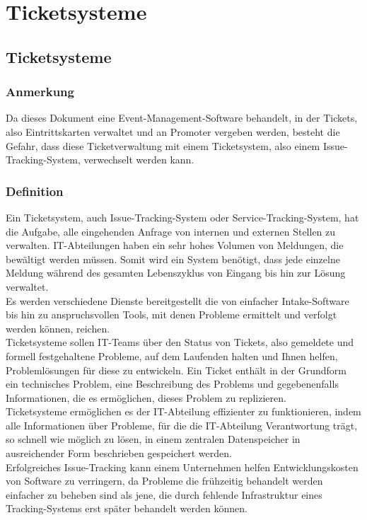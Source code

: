 \chapter{Ticketsysteme}
\reiter

  \section{Ticketsysteme}
  
  \subsection{Anmerkung}
  Da dieses Dokument eine Event-Management-Software behandelt, in der Tickets, also Eintrittskarten verwaltet und an Promoter vergeben werden, besteht die Gefahr, dass diese Ticketverwaltung mit einem Ticketsystem, also einem Issue-Tracking-System, verwechselt werden kann.  
  
  \subsection{Definition}
    Ein Ticketsystem, auch Issue-Tracking-System oder Service-Tracking-System, hat die Aufgabe, alle eingehenden Anfrage von internen und externen Stellen zu verwalten. IT-Abteilungen haben ein sehr hohes Volumen von Meldungen, die bewältigt werden müssen. Somit wird ein System benötigt, dass jede einzelne Meldung während des gesamten Lebenszyklus von Eingang bis hin zur Lösung verwaltet. \\
Es werden verschiedene Dienste bereitgestellt die von einfacher Intake-Software bis hin zu anspruchsvollen Tools, mit denen Probleme ermittelt und verfolgt werden können, reichen. \\
Ticketsysteme sollen IT-Teams über den Status von Tickets, also gemeldete und formell festgehaltene Probleme, auf dem Laufenden halten und Ihnen helfen, Problemlösungen für diese zu entwickeln. 
Ein Ticket enthält in der Grundform ein technisches Problem, eine Beschreibung des Problems und gegebenenfalls Informationen, die es ermöglichen, dieses Problem zu replizieren. \\
Ticketsysteme ermöglichen es der IT-Abteilung effizienter zu funktionieren, indem alle Informationen über Probleme, für die die IT-Abteilung Verantwortung trägt, so schnell wie möglich zu lösen, in einem zentralen Datenspeicher in ausreichender Form beschrieben gespeichert werden. \\
Erfolgreiches Issue-Tracking kann einem Unternehmen helfen Entwicklungskosten von Software zu verringern, da Probleme die frühzeitig behandelt werden einfacher zu beheben sind als jene, die durch fehlende Infrastruktur eines Tracking-Systems erst später behandelt werden können. \\
  
